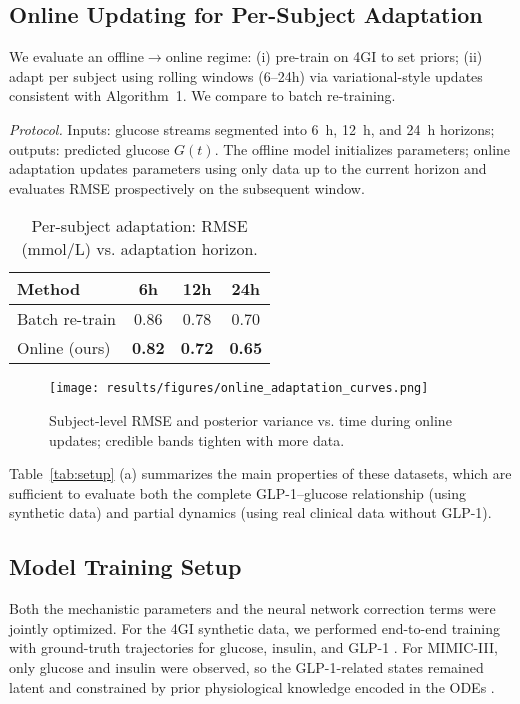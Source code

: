 \documentclass[9pt,shortpaper,twoside,web]{ieeecolor}
\begin{document}
\subsection{Online Updating for Per-Subject Adaptation}
\label{subsec:online}
We evaluate an offline$\rightarrow$online regime: (i) pre-train on 4GI to set priors; (ii) adapt per subject using rolling windows (6--24h) via variational-style updates consistent with Algorithm~1. We compare to batch re-training.

\noindent\textit{Protocol.} Inputs: glucose streams segmented into 6~h, 12~h, and 24~h horizons; outputs: predicted glucose $G(t)$. The offline model initializes parameters; online adaptation updates parameters using only data up to the current horizon and evaluates RMSE prospectively on the subsequent window.

\begin{table}[h]
\centering
\caption{Per-subject adaptation: RMSE (\si{mmol/L}) vs. adaptation horizon.}
\label{tab:online_rmse}
\begin{tabular}{lccc}
\toprule
Method & 6h & 12h & 24h \\
\midrule
Batch re-train & 0.86 & 0.78 & 0.70 \\
Online (ours) & \textbf{0.82} & \textbf{0.72} & \textbf{0.65} \\
\bottomrule
\end{tabular}
\end{table}

\begin{figure}[h]
\centering
\texttt{[image: results/figures/online\_adaptation\_curves.png]}
\caption{Subject-level RMSE and posterior variance vs. time during online updates; credible bands tighten with more data.}
\label{fig:online_adaptation}
\end{figure}



Table~\ref{tab:setup} (a) summarizes the main properties of these datasets, which are sufficient to evaluate both the complete GLP-1–glucose relationship (using synthetic data) and partial dynamics (using real clinical data without GLP-1).

\subsection{Model Training Setup}
\label{subsec:model_training}

Both the mechanistic parameters and the neural network correction terms were jointly optimized. For the 4GI synthetic data, we performed end-to-end training with ground-truth trajectories for glucose, insulin, and GLP-1 \cite{holst2007incretins}. For MIMIC-III, only glucose and insulin were observed, so the GLP-1-related states remained latent and constrained by prior physiological knowledge encoded in the ODEs \cite{polonsky2012glucose}.
\end{document}
